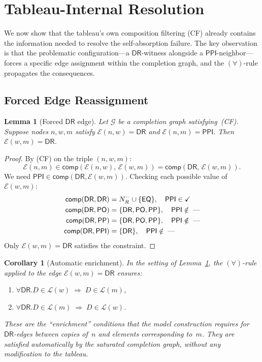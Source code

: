 \documentclass[a4paper,11pt]{article}
\newtheorem{lemma}[theorem]{Lemma}
\newtheorem{corollary}[theorem]{Corollary}
\theoremstyle{definition}
\newcommand{\NR}{\ensuremath{N_R}}
\newcommand{\DR}{\ensuremath{\mathsf{DR}}}
\newcommand{\PO}{\ensuremath{\mathsf{PO}}}
\newcommand{\EQ}{\ensuremath{\mathsf{EQ}}}
\newcommand{\PP}{\ensuremath{\mathsf{PP}}}
\newcommand{\PPI}{\ensuremath{\mathsf{PPI}}}
\newcommand{\comp}{\ensuremath{\mathsf{comp}}}
\begin{document}
\section{Tableau-Internal Resolution}
\label{sec:tableau-resolution}

We now show that the tableau's own composition filtering (CF) already
contains the information needed to resolve the self-absorption failure.
The key observation is that the problematic configuration---a $\DR$-witness
alongside a $\PPI$-neighbor---forces a specific edge assignment within the
completion graph, and the $(\forall)$-rule propagates the consequences.

\subsection{Forced Edge Reassignment}

\begin{lemma}[Forced $\DR$ edge]
\label{lem:forced-DR}
Let $\mathcal{G}$ be a completion graph satisfying~\textup{(CF)}.
Suppose nodes $n, w, m$ satisfy $\mathcal{E}(n, w) = \DR$ and
$\mathcal{E}(n, m) = \PPI$.  Then $\mathcal{E}(w, m) = \DR$.
\end{lemma}

\begin{proof}
By (CF) on the triple $(n, w, m)$:
\[
  \mathcal{E}(n, m) \in \comp(\mathcal{E}(n, w),\, \mathcal{E}(w, m))
  = \comp(\DR,\, \mathcal{E}(w, m)).
\]
We need $\PPI \in \comp(\DR, \mathcal{E}(w, m))$.  Checking each
possible value of $\mathcal{E}(w, m)$:
\begin{align*}
  \comp(\DR, \DR) &= \NR^{-} \cup \{\EQ\}, \quad \PPI \in \checkmark \\
  \comp(\DR, \PO) &= \{\DR, \PO, \PP\}, \quad \PPI \notin \text{\;---} \\
  \comp(\DR, \PP) &= \{\DR, \PO, \PP\}, \quad \PPI \notin \text{\;---} \\
  \comp(\DR, \PPI) &= \{\DR\}, \quad \PPI \notin \text{\;---}
\end{align*}
Only $\mathcal{E}(w, m) = \DR$ satisfies the constraint.
\end{proof}

\begin{corollary}[Automatic enrichment]
\label{cor:enrichment}
In the setting of Lemma~\ref{lem:forced-DR}, the $(\forall)$-rule
applied to the edge $\mathcal{E}(w, m) = \DR$ ensures:
\begin{enumerate}[nosep,label=(\alph*)]
  \item $\forall \DR.D \in \mathcal{L}(w) \;\Rightarrow\; D \in
    \mathcal{L}(m)$,
  \item $\forall \DR.D \in \mathcal{L}(m) \;\Rightarrow\; D \in
    \mathcal{L}(w)$.
\end{enumerate}
These are the ``enrichment'' conditions that the model construction
requires for $\DR$-edges between copies of~$n$ and elements
corresponding to~$m$.  They are satisfied \emph{automatically} by the
saturated completion graph, without any modification to the tableau.
\end{corollary}
\end{document}
